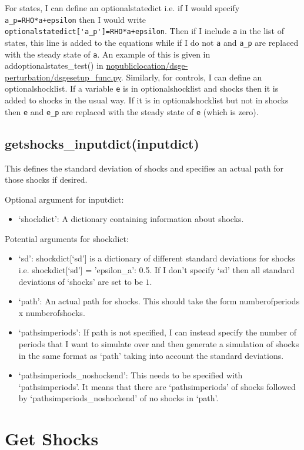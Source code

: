 \documentclass{article}
\theoremstyle{definition}
\begin{document}
For states, I can define an optionalstatedict i.e. if I would specify \verb|a_p=RHO*a+epsilon| then I would write \verb|optionalstatedict['a_p']=RHO*a+epsilon|. Then if I include \verb|a| in the list of states, this line is added to the equations while if I do not \verb|a| and \verb|a_p| are replaced with the steady state of \verb|a|. An example of this is given in addoptionalstates\_test() in \url{nopubliclocation/dsge-perturbation/dsgesetup_func.py}. Similarly, for controls, I can define an optionalshocklist. If a variable \verb|e| is in optionalshocklist and shocks then it is added to shocks in the usual way. If it is in optionalshocklist but not in shocks then \verb|e| and \verb|e_p| are replaced with the steady state of \verb|e| (which is zero).

\subsection{getshocks\_inputdict(inputdict)}
This defines the standard deviation of shocks and specifies an actual path for those shocks if desired.

Optional argument for inputdict:
\begin{itemize}
    \item `shockdict': A dictionary containing information about shocks.
\end{itemize}

Potential arguments for shockdict:
\begin{itemize}
    \item `sd': shockdict[`sd'] is a dictionary of different standard deviations for shocks i.e. shockdict[`sd'] = {'epsilon\_a': 0.5}. If I don't specify `sd' then all standard deviations of `shocks' are set to be $1$.
    \item `path': An actual path for shocks. This should take the form numberofperiods x numberofshocks.
    \item `pathsimperiods': If path is not specified, I can instead specify the number of periods that I want to simulate over and then generate a simulation of shocks in the same format as `path' taking into account the standard deviations.
    \item `pathsimperiods\_noshockend': This needs to be specified with `pathsimperiods'. It means that there are `pathsimperiods' of shocks followed by `pathsimperiods\_noshockend' of no shocks in `path'.
\end{itemize}

\section{Get Shocks}
\end{document}
